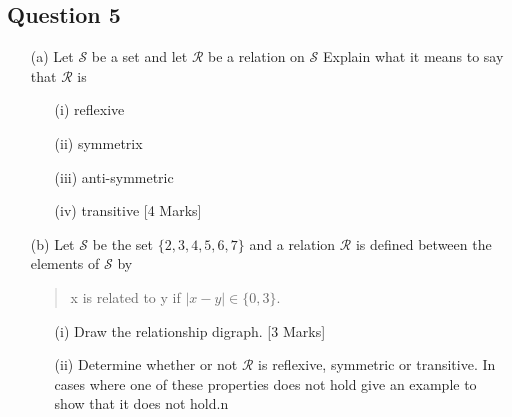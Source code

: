 \documentclass[a4paper,12pt]{article}
\begin{document}
\subsection*{Question 5}
\begin{itemize}
\item[(a)] Let $\mathcal{S}$ be a set and let $\mathcal{R}$ be a relation on $\mathcal{S}$
Explain what it means to say that $\mathcal{R}$ is

\begin{itemize}
\item[(i)] reflexive
\item[(ii)] symmetrix
\item[(iii)] anti-symmetric
\item[(iv)] transitive [4 Marks]
\end{itemize}

\item[(b)]  Let $\mathcal{S}$ be the set $\{2,3,4,5,6,7\}$ and a relation $\mathcal{R}$ is defined between the elements of $\mathcal{S}$ by
    \begin{center}
\begin{quote}
x is related to y if $|x - y| \in \{0,3\}$.
\end{quote}
\end{center}
\begin{itemize}
\item[(i)] Draw the relationship digraph. [3 Marks]
\item[(ii)] Determine whether or not $\mathcal{R}$ is reflexive, symmetric or transitive. In cases
where one of these properties does not hold give an example to show that
it does not hold.n \newline [3 Marks]
\end{itemize}
\end{itemize}
\end{document}
